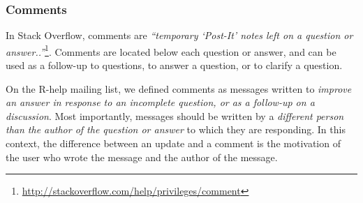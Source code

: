 \subsubsection{Comments}
In Stack Overflow, comments are \textit{``temporary `Post-It' notes left on a question or answer..''}\footnote{\url{http://stackoverflow.com/help/privileges/comment}}.
    Comments are located below each question or answer, and can be used as a follow-up to questions, to answer a question, or to clarify a question.

    On the R-help mailing list, we defined comments as messages written to \emph{improve an answer in response to an incomplete question, or as a follow-up on a discussion}.
    Most importantly, messages should be written by a \emph{different person than the author of the question or answer} to which they are responding.
    In this context, the difference between an update and a comment is the motivation of the user who wrote the message and the author of the message.



